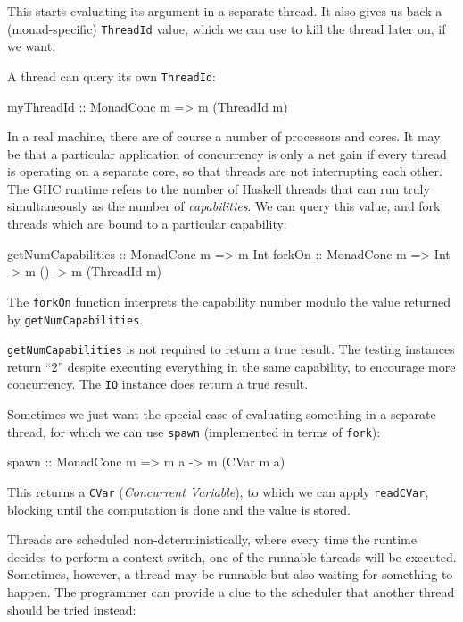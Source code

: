 This starts evaluating its argument in a separate thread. It also
gives us back a (monad-specific) \verb|ThreadId| value, which we can
use to kill the thread later on, if we want.

A thread can query its own \verb|ThreadId|:

\begin{haskellcode}
myThreadId :: MonadConc m => m (ThreadId m)
\end{haskellcode}

In a real machine, there are of course a number of processors and
cores. It may be that a particular application of concurrency is only
a net gain if every thread is operating on a separate core, so that
threads are not interrupting each other. The GHC runtime refers to the
number of Haskell threads that can run truly simultaneously as the
number of \emph{capabilities}. We can query this value, and fork
threads which are bound to a particular capability:

\begin{haskellcode}
getNumCapabilities :: MonadConc m => m Int
forkOn :: MonadConc m => Int -> m () -> m (ThreadId m)
\end{haskellcode}

The \verb|forkOn| function interprets the capability number modulo the
value returned by \verb|getNumCapabilities|.

\begin{departure}
  \verb|getNumCapabilities| is not required to return a true
  result. The testing instances return ``2'' despite executing
  everything in the same capability, to encourage more
  concurrency. The \verb|IO| instance does return a true result.
\end{departure}

Sometimes we just want the special case of evaluating something in a
separate thread, for which we can use \verb|spawn| (implemented in
terms of \verb|fork|):

\begin{haskellcode}
spawn :: MonadConc m => m a -> m (CVar m a)
\end{haskellcode}

This returns a \verb|CVar| (\emph{Concurrent Variable}), to which we
can apply \verb|readCVar|, blocking until the computation is done and
the value is stored.

Threads are scheduled non-deterministically, where every time the
runtime decides to perform a context switch, one of the runnable
threads will be executed. Sometimes, however, a thread may be runnable
but also waiting for something to happen. The programmer can provide a
clue to the scheduler that another thread should be tried instead:

